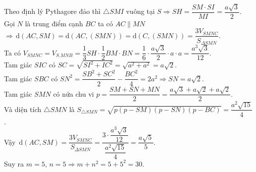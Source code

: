 \begin{bt}
{		\noindent
		Theo định lý Pythagore đảo thì $\triangle SMI$ vuông tại $S \Rightarrow SH=\dfrac{SM\cdot SI}{MI}=\dfrac{a\sqrt{3}}{2}$. \\
		Gọi $N$ là trung điểm cạnh $BC$ ta có $AC \parallel MN$ \\
		$ \Rightarrow \mathrm{\,d}(AC,SM)=\mathrm{d}(AC,(SMN))=\mathrm{d}(C,(SMN))=\dfrac{3V_{SMNC}}{S_{\Delta SMN}}$. \\
		Ta có $V_{SMNC}=V_{S.MNB}=\dfrac{1}{3}SH\cdot\dfrac{1}{2}BM\cdot BN=\dfrac{1}{6}\cdot\dfrac{a\sqrt{3}}{2}\cdot a\cdot a=\dfrac{a^3\sqrt{3}}{12}$. \\
		Tam giác $SIC$ có $SC=\sqrt{SI^2+IC^2}=\sqrt{a^2+a^2}=a\sqrt{2}$. \\
		Tam giác $SBC$ có $SN^2=\dfrac{SB^2+SC^2}{2}-\dfrac{BC^2}{4}=2a^2 \Rightarrow SN=a\sqrt{2}$. \\
		Tam giác $SMN$ có nửa chu vi $p=\dfrac{SM+SN+MN}{2}=\dfrac{a\sqrt{3}+a\sqrt{2}+a\sqrt{2}}{2}$. \\
		Và diện tích $\triangle SMN$ là $S_{\triangle SMN}=\sqrt{p(p-SM)(p-SN)(p-BC)}=\dfrac{a^2\sqrt{15}}{4}$. \\
		Vậy $\mathrm{\,d}(AC,SM)=\dfrac{3V_{SMNC}}{S_{\Delta SMN}}=\dfrac{3\cdot \dfrac{a^3\sqrt{3}}{12}}{\dfrac{a^2\sqrt{15}}{4}}=\dfrac{a\sqrt{5}}{5}$.\\
		Suy ra $m=5$, $n=5\Rightarrow m+n^2=5+5^2=30$.
		}
\end{bt}


